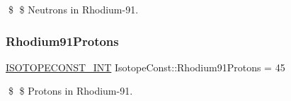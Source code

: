 \$ \$ Neutrons in Rhodium-\/91. \mbox{\label{group___isotope_const-_rhodium-_rh91_gad3dee80d05b6f08572ef7f2bebde5b05}} 
\subsubsection{\texorpdfstring{Rhodium91\+Protons}{Rhodium91Protons}}
{\footnotesize\ttfamily \mbox{\hyperlink{group___isotope_const-_macros_ga5f18360b3e99483a35c32d789e62621c}{I\+S\+O\+T\+O\+P\+E\+C\+O\+N\+S\+T\+\_\+\+I\+NT}} Isotope\+Const\+::\+Rhodium91\+Protons = 45}

\$ \$ Protons in Rhodium-\/91. 